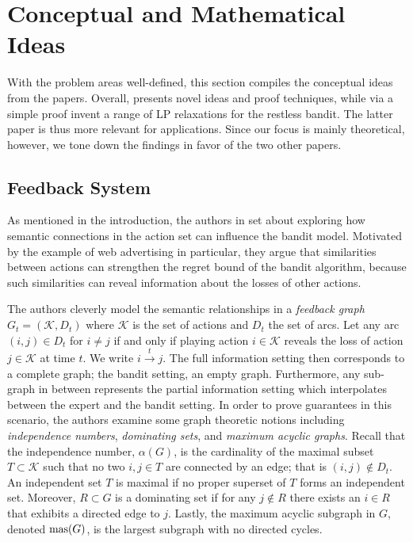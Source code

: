 \section{Conceptual and Mathematical Ideas}
With the problem areas well-defined, this section compiles the conceptual ideas from the papers. Overall, \citep{alon, hazan} presents novel ideas and proof techniques, while \citep{bertsimas} via a simple proof invent a range of LP relaxations for the restless bandit. The latter paper is thus more relevant for applications. Since our focus is mainly theoretical, however, we tone down the findings \citep{bertsimas} in favor of the two other papers.

\subsection{Feedback System}
As mentioned in the introduction, the authors in \citep{alon} set about exploring how semantic connections in the action set can influence the bandit model. Motivated by the example of web advertising in particular, they argue that similarities between actions can strengthen the regret bound of the bandit algorithm, because such similarities can reveal information about the losses of other actions. 

The authors cleverly model the semantic relationships in a \textit{feedback graph} $G_t=(\mathcal{K},D_t)$ where $\mathcal{K}$ is the set of actions and $D_t$ the set of arcs. Let any arc $(i,j)\in D_t$ for $i\not=j$ if and only if playing action $i\in\mathcal{K}$ reveals the loss of action $j\in \mathcal{K}$ at time $t$. We write $i\overset{t}{\to}j$. The full information setting then corresponds to a complete graph; the bandit setting, an empty graph. Furthermore, any sub-graph in between represents the partial information setting which interpolates between the expert and the bandit setting. In order to prove guarantees in this scenario, the authors examine some graph theoretic notions including \textit{independence numbers}, \textit{dominating sets}, and \textit{maximum acyclic graphs}. Recall that the independence number, $\alpha(G)$, is the cardinality of the maximal subset $T\subset \mathcal{K}$ such that no two $i,j\in T$ are connected by an edge; that is $(i,j)\not\in D_t$. An independent set $T$ is maximal if no proper superset of $T$ forms an independent set. Moreover, $R\subset G$ is a dominating set if for any $j\not\in R$ there exists an $i\in R$ that exhibits a directed edge to $j$. Lastly, the maximum acyclic subgraph in $G$, denoted $\text{\normalfont mas}(G)$, is the largest subgraph with no directed cycles. 

